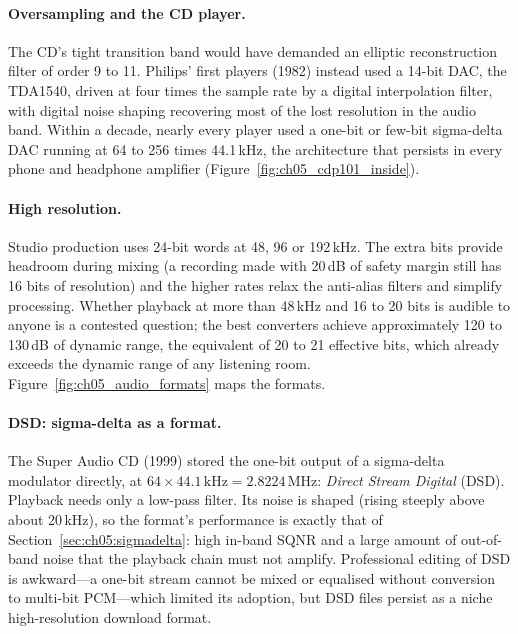 
\paragraph{Oversampling and the CD player.} The CD's tight transition band would have demanded an
elliptic reconstruction filter of order 9 to 11. Philips' first players (1982) instead used a
14-bit DAC, the TDA1540, driven at four times the sample rate by a digital interpolation filter,
with digital noise shaping recovering most of the lost resolution in the audio band. Within a
decade, nearly every player used a one-bit or few-bit sigma-delta DAC running at 64 to 256 times
44.1\,kHz, the architecture that persists in every phone and headphone amplifier
(Figure~\ref{fig:ch05_cdp101_inside}).


\paragraph{High resolution.} Studio production uses 24-bit words at 48, 96 or 192\,kHz. The extra
bits provide headroom during mixing (a recording made with 20\,dB of safety margin still has 16 bits
of resolution) and the higher rates relax the anti-alias filters and simplify processing. Whether
playback at more than 48\,kHz and 16 to 20 bits is audible to anyone is a contested question; the
best converters achieve approximately 120 to 130\,dB of dynamic range, the equivalent of 20 to 21
effective bits, which already exceeds the dynamic range of any listening room.
Figure~\ref{fig:ch05_audio_formats} maps the formats.

\paragraph{DSD: sigma-delta as a format.} The Super Audio CD (1999) stored the one-bit output of a
sigma-delta modulator directly, at $64\times44.1\,\text{kHz}=2.8224$\,MHz: \emph{Direct Stream
Digital} (DSD). Playback needs only a low-pass filter. Its noise is shaped (rising steeply above
about 20\,kHz), so the format's performance is exactly that of Section~\ref{sec:ch05:sigmadelta}:
high in-band SQNR and a large amount of out-of-band noise that the playback chain must not
amplify. Professional editing of DSD is awkward---a one-bit stream cannot be mixed or equalised
without conversion to multi-bit PCM---which limited its adoption, but DSD files persist as a
niche high-resolution download format.

